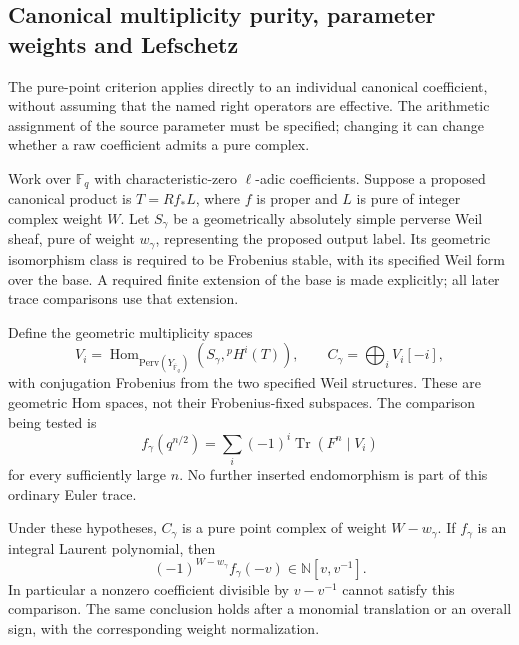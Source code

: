 \subsection{Canonical multiplicity purity, parameter weights and Lefschetz}
\label{sec:canonicalPureComparison}

The pure-point criterion applies directly to an individual
canonical coefficient, without assuming that the named right
operators are effective. The arithmetic assignment of the
source parameter must be specified; changing it can change
whether a raw coefficient admits a pure complex.

Work over \(\mathbb F_q\) with characteristic-zero
\(\ell\)-adic coefficients. Suppose a proposed canonical
product is \(T=Rf_*L\), where \(f\) is proper and \(L\)
is pure of integer complex weight \(W\). Let \(S_\gamma\)
be a geometrically absolutely simple perverse Weil sheaf,
pure of weight \(w_\gamma\), representing the proposed
output label. Its geometric isomorphism class is required
to be Frobenius stable, with its specified Weil form over
the base. A required finite extension of the base is made
explicitly; all later trace comparisons use that extension.

Define the geometric multiplicity spaces
\[
 V_i=\operatorname{Hom}_{\mathrm{Perv}(Y_{\overline{\mathbb F}_q})}
             (S_\gamma,{}^pH^i(T)),
 \qquad C_\gamma=\bigoplus_i V_i[-i],
\]
with conjugation Frobenius from the two specified Weil
structures. These are geometric Hom spaces, not their
Frobenius-fixed subspaces. The comparison being tested is
\begin{equation}\label{eq:canonicalMultiplicityTrace}
 f_\gamma(q^{n/2})
     =\sum_i(-1)^i\operatorname{Tr}(F^n\mid V_i)
\end{equation}
for every sufficiently large \(n\). No further inserted
endomorphism is part of this ordinary Euler trace.

\begin{finding}
\label{f:properCanonicalMultiplicity}
Under these hypotheses, \(C_\gamma\) is a pure point
complex of weight \(W-w_\gamma\). If \(f_\gamma\) is an
integral Laurent polynomial, then
\[
                 (-1)^{W-w_\gamma}f_\gamma(-v)
                    \in\mathbb N[v,v^{-1}].
\]
In particular a nonzero coefficient divisible by
\(v-v^{-1}\) cannot satisfy this comparison. The same
conclusion holds after a monomial translation or an
overall sign, with the corresponding weight normalization.
\end{finding}

